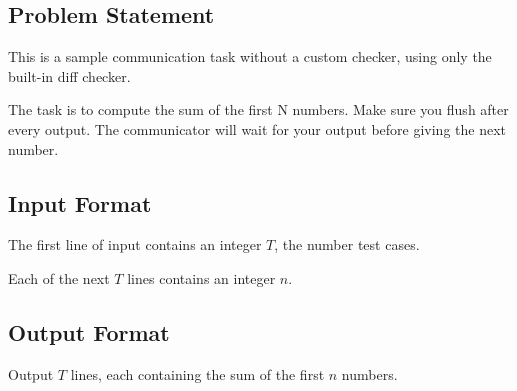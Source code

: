\subsection*{Problem Statement}

This is a sample communication task without a custom checker, using only the built-in diff checker.

The task is to compute the sum of the first N numbers. Make sure you flush after every output. The communicator will wait for your output before giving the next number.

\subsection*{Input Format}

The first line of input contains an integer \(T\), the number test cases.

Each of the next \(T\) lines contains an integer \(n\).

\subsection*{Output Format}

Output \(T\) lines, each containing the sum of the first \(n\) numbers.
